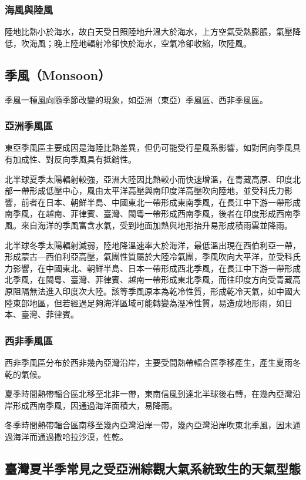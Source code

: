 \documentclass[a4paper,12pt]{report}
\begin{document}
\begin{itemize}
\subsubsection{海風與陸風}
陸地比熱小於海水，故白天受日照陸地升溫大於海水，上方空氣受熱膨脹，氣壓降低，吹海風；晚上陸地輻射冷卻快於海水，空氣冷卻收縮，吹陸風。
\subsection{季風（Monsoon）}
季風一種風向隨季節改變的現象，如亞洲（東亞）季風區、西非季風區。
\subsubsection{亞洲季風區}
東亞季風區主要成因是海陸比熱差異，但仍可能受行星風系影響，如對同向季風具有加成性、對反向季風具有抵銷性。

北半球夏季太陽輻射較強，亞洲大陸因比熱較小而快速增溫，在青藏高原、印度北部一帶形成低壓中心，風由太平洋高壓與南印度洋高壓吹向陸地，並受科氏力影響，前者在日本、朝鮮半島、中國東北一帶形成東南季風，在長江中下游一帶形成南季風，在越南、菲律賓、臺灣、閩粵一帶形成西南季風，後者在印度形成西南季風。來自海洋的季風富含水氣，受到地面加熱與地形抬升易形成積雨雲並降雨。

北半球冬季太陽輻射減弱，陸地降溫速率大於海洋，最低溫出現在西伯利亞一帶，形成蒙古—西伯利亞高壓，氣團性質屬於大陸冷氣團，季風吹向大平洋，並受科氏力影響，在中國東北、朝鮮半島、日本一帶形成西北季風，在長江中下游一帶形成北季風，在閩粵、臺灣、菲律賓、越南一帶形成東北季風，而往印度方向受青藏高原阻隔無法進入印度次大陸。該等季風原本為乾冷性質，形成乾冷天氣，如中國大陸東部地區，但若經過足夠海洋區域可能轉變為溼冷性質，易造成地形雨，如日本、臺灣、菲律賓。
\subsubsection{西非季風區}
西非季風區分布於西非幾內亞灣沿岸，主要受間熱帶輻合區季移產生，產生夏雨冬乾的氣候。

夏季時間熱帶輻合區北移至北非一帶，東南信風到達北半球後右轉，在幾內亞灣沿岸形成西南季風，因通過海洋面積大，易降雨。

冬季時間熱帶輻合區南移至幾內亞灣沿岸一帶，幾內亞灣沿岸吹東北季風，因未通過海洋而通過撒哈拉沙漠，性乾。
\subsection{臺灣夏半季常見之受亞洲綜觀大氣系統致生的天氣型態}

\end{itemize}
\end{document}
